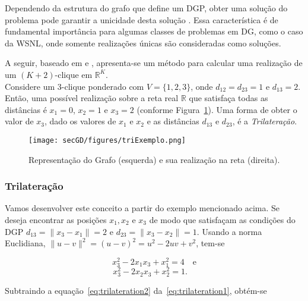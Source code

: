 Dependendo da estrutura do grafo que define um DGP, obter uma solução do problema pode garantir a unicidade desta solução \cite{eren2004rigidity}. Essa característica é de fundamental importância para algumas classes de problemas em DG, como o caso da WSNL, onde somente realizações únicas são consideradas como soluções. 

A seguir, baseado em \cite{libertiEDG} e \cite{trilaterationDong}, apresenta-se um método para calcular uma realização de um $(K+2)$-clique em $\mathbb{R}^K$.
\\

Considere um 3-clique ponderado com $V = \{1,2,3\}$, onde $d_{12} = d_{23} = 1$ e $d_{13} = 2$. Então, uma possível realização sobre a reta real $\mathbb{R}$ que satisfaça todas as distâncias é $x_1 = 0$, $x_2 = 1$ e $x_3 = 2$ (conforme Figura~\ref{fig:triexemplo}). Uma forma de obter o valor de $x_3$, dado os valores de $x_1$ e $x_2$ e as distâncias $d_{13}$ e $d_{23}$, é a \textit{Trilateração}.

\begin{figure}[H]
	\begin{center}
		\texttt{[image: secGD/figures/triExemplo.png]}
	\end{center}
	\caption{Representação do Grafo (esquerda) e sua realização na reta (direita).}
	\label{fig:triexemplo}
\end{figure}

\subsubsection{Trilateração\label{sec:trilateration}}

 Vamos desenvolver este conceito a partir do exemplo mencionado acima. Se deseja encontrar as posições $x_1, x_2$ e $x_3$ de modo que satisfaçam as condições do DGP $d_{13} = \lVert x_3 - x_1\rVert = 2$ e $d_{23} = \lVert x_3 - x_2 \rVert = 1$. Usando a norma Euclidiana, $\lVert u-v\rVert^2 = (u-v)^2 = u^2 -2uv + v^2$, tem-se

\begin{equation}
	x_3^2 - 2x_1x_3 +x_1^2 = 4 \quad \textrm{e}
	\label{eq:trilateration1}
\end{equation}
\begin{equation}
x_3^2 - 2x_2x_3 +x_2^2 = 1. \quad
\label{eq:trilateration2}
\end{equation}

Subtraindo a equação~\ref{eq:trilateration2} da~\ref{eq:trilateration1}, obtém-se

